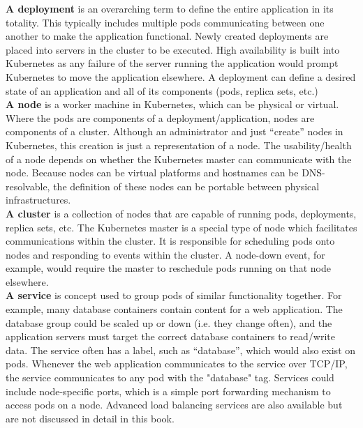 \textbf{A deployment} is an overarching term to define the entire application
in its totality. This typically includes multiple pods communicating between
one another to make the application functional. Newly created deployments are
placed into servers in the cluster to be executed. High availability is built
into Kubernetes as any failure of the server running the application would
prompt Kubernetes to move the application elsewhere. A deployment can define a
desired state of an application and all of its components (pods, replica sets,
etc.) \\

\textbf{A node} is a worker machine in Kubernetes, which can be physical or
virtual. Where the pods are components of a deployment/application, nodes are
components of a cluster. Although an administrator and just ``create'' nodes in
Kubernetes, this creation is just a representation of a node. The
usability/health of a node depends on whether the Kubernetes master can
communicate with the node. Because nodes can be virtual platforms and
hostnames can be DNS-resolvable, the definition of these nodes can be portable
between physical infrastructures. \\

\textbf{A cluster} is a collection of nodes that are capable of running pods,
deployments, replica sets, etc. The Kubernetes master is a special type of
node which facilitates communications within the cluster. It is responsible
for scheduling pods onto nodes and responding to events within the cluster. A
node-down event, for example, would require the master to reschedule pods
running on that node elsewhere. \\

\textbf{A service} is concept used to group pods of similar functionality
together. For example, many database containers contain content for a web
application. The database group could be scaled up or down (i.e. they change
often), and the application servers must target the correct database
containers to read/write data. The service often has a label, such as
``database'', which would also exist on pods. Whenever the web application
communicates to the service over TCP/IP, the service communicates to any pod
with the "database" tag. Services could include node-specific ports, which is
a simple port forwarding mechanism to access pods on a node. Advanced load
balancing services are also available but are not discussed in detail in this
book. \\

